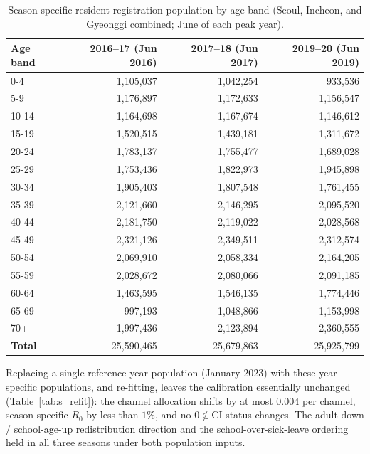 \documentclass[12pt]{article}
\begin{document}
\begin{table}[H]
\centering
\caption{Season-specific resident-registration population by age band (Seoul,
Incheon, and Gyeonggi combined; June of each peak year).}
\label{tab:s_pop}
\begin{tabular}{@{}lrrr@{}}
\toprule
Age band & 2016--17 (Jun 2016) & 2017--18 (Jun 2017) & 2019--20 (Jun 2019) \\
\midrule
0-4 & 1,105,037 & 1,042,254 & 933,536 \\
5-9 & 1,176,897 & 1,172,633 & 1,156,547 \\
10-14 & 1,164,698 & 1,167,674 & 1,146,612 \\
15-19 & 1,520,515 & 1,439,181 & 1,311,672 \\
20-24 & 1,783,137 & 1,755,477 & 1,689,028 \\
25-29 & 1,753,436 & 1,822,973 & 1,945,898 \\
30-34 & 1,905,403 & 1,807,548 & 1,761,455 \\
35-39 & 2,121,660 & 2,146,295 & 2,095,520 \\
40-44 & 2,181,750 & 2,119,022 & 2,028,568 \\
45-49 & 2,321,126 & 2,349,511 & 2,312,574 \\
50-54 & 2,069,910 & 2,058,334 & 2,164,205 \\
55-59 & 2,028,672 & 2,080,066 & 2,091,185 \\
60-64 & 1,463,595 & 1,546,135 & 1,774,446 \\
65-69 & 997,193 & 1,048,866 & 1,153,998 \\
70+ & 1,997,436 & 2,123,894 & 2,360,555 \\
\midrule
\textbf{Total} & 25,590,465 & 25,679,863 & 25,925,799 \\
\bottomrule
\end{tabular}
\end{table}

Replacing a single reference-year population (January 2023) with these
year-specific populations, and re-fitting, leaves the calibration essentially
unchanged (Table~\ref{tab:s_refit}): the channel allocation shifts by at most
$0.004$ per channel, season-specific $R_0$ by less than $1\%$, and no
$0\notin\text{CI}$ status changes. The adult-down / school-age-up redistribution
direction and the school-over-sick-leave ordering held in all three seasons
under both population inputs.
\end{document}
